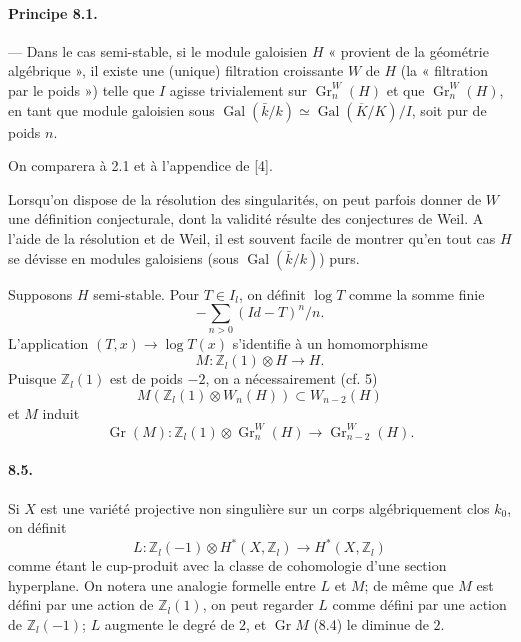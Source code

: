 \documentclass[10pt]{article}
\newcommand{\Z}{\mathbb Z}
\newcommand{\Gr}{\operatorname{Gr}}
\newcommand{\Gal}{\operatorname{Gal}}
\newcommand{\barK}{\overline{K}}
\begin{document}
\paragraph{Principe 8.1.} — Dans le cas semi-stable, si le module galoisien $H$ « provient de la géométrie algébrique », il existe une (unique) filtration croissante $W$ de $H$ (la « filtration par le poids ») telle que $I$ agisse trivialement sur $\Gr_n^W(H)$ et que $\Gr_n^W(H)$, en tant que module galoisien sous $\Gal(\bar k/k)\simeq\Gal(\barK/K)/I$, soit pur de poids $n$.

On comparera à 2.1 et à l'appendice de [4].

Lorsqu'on dispose de la résolution des singularités, on peut parfois donner de $W$ une définition conjecturale, dont la validité résulte des conjectures de Weil. A l'aide de la résolution et de Weil, il est souvent facile de montrer qu'en tout cas $H$ se dévisse en modules galoisiens (sous $\Gal(\bar k/k)$) purs.

Supposons $H$ semi-stable. Pour $T\in I_l$, on définit $\log T$ comme la somme finie
\[
-\sum_{n>0}(\mathit{Id}-T)^n/n.
\]
L'application $(T,x)\to\log T(x)$ s'identifie à un homomorphisme
\[
\tag{8.2}
M:\Z_l(1)\otimes H\longrightarrow H.
\]
Puisque $\Z_l(1)$ est de poids $-2$, on a nécessairement (cf. 5)
\[
\tag{8.3}
M(\Z_l(1)\otimes W_n(H))\subset W_{n-2}(H)
\]
et $M$ induit
\[
\tag{8.4}
\Gr(M):\Z_l(1)\otimes\Gr_n^W(H)\longrightarrow\Gr_{n-2}^W(H).
\]

\paragraph{8.5.} Si $X$ est une variété projective non singulière sur un corps algébriquement clos $k_0$, on définit
\[
L:\Z_l(-1)\otimes H^*(X,\Z_l)\longrightarrow H^*(X,\Z_l)
\]
comme étant le cup-produit avec la classe de cohomologie d'une section hyperplane. On notera une analogie formelle entre $L$ et $M$; de même que $M$ est défini par une action de $\Z_l(1)$, on peut regarder $L$ comme défini par une action de $\Z_l(-1)$; $L$ augmente le degré de $2$, et $\Gr M$ (8.4) le diminue de $2$.
\end{document}
